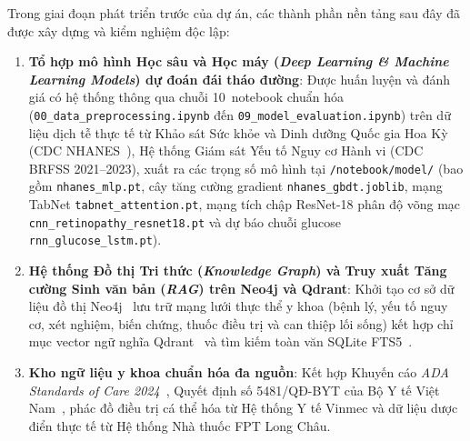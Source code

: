Trong giai đoạn phát triển trước của dự án, các thành phần nền tảng sau đây đã được xây dựng và kiểm nghiệm độc lập:
\begin{enumerate}
  \item \textbf{Tổ hợp mô hình Học sâu và Học máy (\emph{Deep Learning \& Machine Learning Models}) dự đoán đái tháo đường}: Được huấn luyện và đánh giá có hệ thống thông qua chuỗi 10~notebook chuẩn hóa (\texttt{00\_data\_preprocessing.ipynb} đến \texttt{09\_model\_evaluation.ipynb}) trên dữ liệu dịch tễ thực tế từ Khảo sát Sức khỏe và Dinh dưỡng Quốc gia Hoa Kỳ (CDC NHANES~\cite{nhanes}), Hệ thống Giám sát Yếu tố Nguy cơ Hành vi (CDC BRFSS 2021--2023), xuất ra các trọng số mô hình tại \texttt{/notebook/model/} (bao gồm  \texttt{nhanes\_mlp.pt}, cây tăng cường gradient \texttt{nhanes\_gbdt.joblib}, mạng TabNet \texttt{tabnet\_attention.pt}, mạng tích chập ResNet-18 phân độ võng mạc \texttt{cnn\_retinopathy\_resnet18.pt} và  dự báo chuỗi glucose \texttt{rnn\_glucose\_lstm.pt}).
  \item \textbf{Hệ thống Đồ thị Tri thức (\emph{Knowledge Graph}) và Truy xuất Tăng cường Sinh văn bản (\emph{RAG}) trên Neo4j và Qdrant}: Khởi tạo cơ sở dữ liệu đồ thị Neo4j~\cite{neo4j} lưu trữ mạng lưới thực thể y khoa (bệnh lý, yếu tố nguy cơ, xét nghiệm, biến chứng, thuốc điều trị và can thiệp lối sống) kết hợp chỉ mục vector ngữ nghĩa Qdrant~\cite{qdrant} và tìm kiếm toàn văn SQLite FTS5~\cite{sqlitefts5}.
  \item \textbf{Kho ngữ liệu y khoa chuẩn hóa đa nguồn}: Kết hợp Khuyến cáo \emph{ADA Standards of Care 2024}~\cite{ada2024}, Quyết định số 5481/QĐ-BYT của Bộ Y tế Việt Nam~\cite{byt5481}, phác đồ điều trị cá thể hóa từ Hệ thống Y tế Vinmec và dữ liệu dược điển thực tế từ Hệ thống Nhà thuốc FPT Long Châu.
\end{enumerate}

